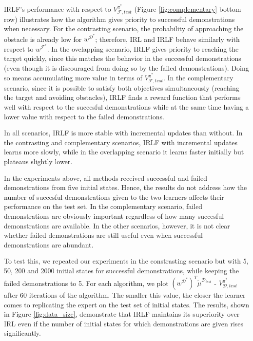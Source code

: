 \documentclass[a4paper,11pt]{report}
\begin{document}
IRLF's performance with respect to $V^{\pi^*}_{\mathcal{F},test}$ (Figure \ref{fig:complementary} bottom row) illustrates how the algorithm gives priority to successful demonstrations when necessary. For the contrasting scenario, the probability of approaching the obstacle is already low for $w^{\mathcal{D}^*}$; therefore, IRL and IRLF behave similarly with respect to $w^{\mathcal{F}^*}$. In the ovelapping scenario, IRLF gives priority to reaching the target quickly, since this matches the behavior in the successful demonstrations (even though it is discouraged from doing so by the failed demonstrations). Doing so means accumulating more value in terms of $V^{\pi^*}_{\mathcal{F},test}$. In the complementary scenario, since it is possible to satisfy both objectives simultaneously (reaching the target and avoiding obstacles), IRLF finds a reward function that performs well with respect to the succesful demonstrations while at the same time having a lower value with respect to the failed demonstrations.

 In all scenarios, IRLF is more stable with incremental updates than without.  In the contrasting and complementary scenarios, IRLF with incremental updates learns more slowly, while in the overlapping scenario it learns faster initially but plateaus slightly lower.

 In the experiments above, all methods received successful and failed demonstrations from five initial states. Hence, the results do not address how the number of succesful demonstrations given to the two learners affects their performance on the test set. In the complementary scenario, failed demonstrations are obviously important regardless of how many succesful demonstrations are available. In the other scenarios, however, it is not clear whether failed demonstrations are still useful even when successful demonstrations are abundant.

To test this, we repeated our experiments in the constrasting scenario but with 5, 50, 200 and 2000 initial states for successful demonstrations, while keeping the failed demonstrations to 5. For each algorithm, we plot  $(w^{\mathcal{D}^*})^T\widetilde{\mu}^{\mathcal{D}_{test}}$ - $V^{\pi^*}_{\mathcal{D},test}$ after 60 iterations of the algorithm. The smaller this value, the closer the learner comes to replicating the expert on the test set of initial states. The results, shown in Figure \ref{fig:data_size}, demonstrate that IRLF maintains its superiority over IRL even if the number of initial states for which demonstrations are given rises significantly. 
\end{document}

